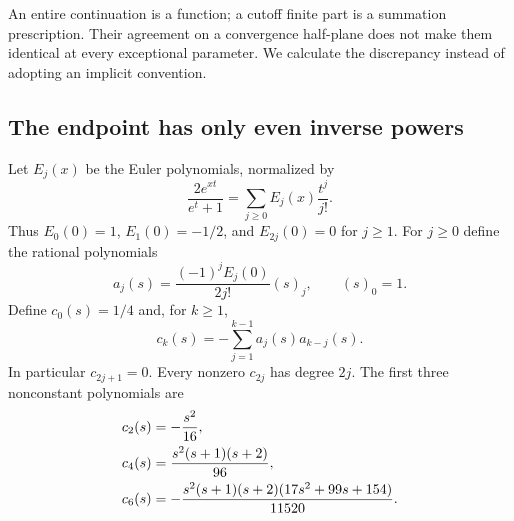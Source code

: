 An entire continuation is a function; a cutoff finite part is a summation
prescription. Their agreement on a convergence half-plane does not make
them identical at every exceptional parameter. We calculate the discrepancy
instead of adopting an implicit convention.

\subsection{The endpoint has only even inverse powers}

Let $E_j(x)$ be the Euler polynomials, normalized by
\begin{equation}\label{cut:Euler}
 \frac{2e^{xt}}{e^t+1}=\sum_{j\ge0}E_j(x)\frac{t^j}{j!}.
\end{equation}
Thus $E_0(0)=1$, $E_1(0)=-1/2$, and $E_{2j}(0)=0$ for $j\ge1$.
For $j\ge0$ define the rational polynomials
\begin{equation}\label{cut:a}
 a_j(s)=\frac{(-1)^jE_j(0)}{2j!}(s)_j,
 \qquad (s)_0=1.
\end{equation}
Define $c_0(s)=1/4$ and, for $k\ge1$,
\begin{equation}\label{cut:c}
 c_k(s)=-\sum_{j=1}^{k-1}a_j(s)a_{k-j}(s).
\end{equation}
In particular $c_{2j+1}=0$. Every nonzero $c_{2j}$ has degree $2j$.
The first three nonconstant polynomials are
\begin{align}
 c_2(s)&=-\frac{s^2}{16},\label{cut:firstc}\\
 c_4(s)&=\frac{s^2(s+1)(s+2)}{96},\notag\\
 c_6(s)&=-\frac{s^2(s+1)(s+2)(17s^2+99s+154)}{11520}.\notag
\end{align}

